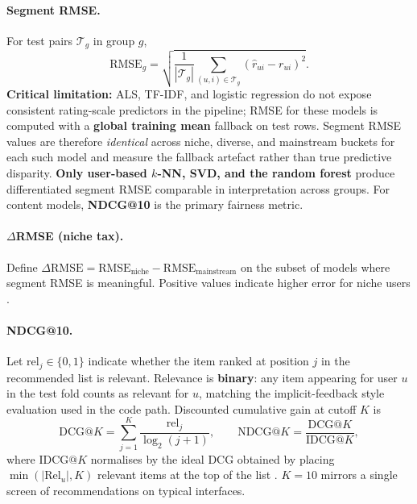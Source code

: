\paragraph{Segment RMSE.}
For test pairs $\mathcal{T}_g$ in group $g$,
\begin{equation}
  \text{RMSE}_g = \sqrt{\frac{1}{|\mathcal{T}_g|}\sum_{(u,i)\in\mathcal{T}_g}(\hat r_{ui}-r_{ui})^2}.
\end{equation}
\textbf{Critical limitation:} ALS, TF-IDF, and logistic regression do not expose consistent rating-scale predictors in the pipeline; RMSE for these models is computed with a \textbf{global training mean} fallback on test rows. Segment RMSE values are therefore \emph{identical} across niche, diverse, and mainstream buckets for each such model and measure the fallback artefact rather than true predictive disparity. \textbf{Only user-based $k$-NN, SVD, and the random forest} produce differentiated segment RMSE comparable in interpretation across groups. For content models, \textbf{NDCG@10} is the primary fairness metric.

\paragraph{$\Delta$RMSE (niche tax).}
Define $\Delta\text{RMSE} = \text{RMSE}_{\text{niche}} - \text{RMSE}_{\text{mainstream}}$ on the subset of models where segment RMSE is meaningful. Positive values indicate higher error for niche users \citep{abdollahpouri2020multistakeholder}.

\paragraph{NDCG@10.}
Let $\text{rel}_j\in\{0,1\}$ indicate whether the item ranked at position $j$ in the recommended list is relevant. Relevance is \textbf{binary}: any item appearing for user $u$ in the test fold counts as relevant for $u$, matching the implicit-feedback style evaluation used in the code path. Discounted cumulative gain at cutoff $K$ is
\begin{equation}
  \text{DCG@}K = \sum_{j=1}^{K}\frac{\text{rel}_j}{\log_2(j+1)}, \qquad
  \text{NDCG@}K = \frac{\text{DCG@}K}{\text{IDCG@}K},
\end{equation}
where $\text{IDCG@}K$ normalises by the ideal DCG obtained by placing $\min(|\text{Rel}_u|,K)$ relevant items at the top of the list \citep{jarvelin2002cumulated}. $K=10$ mirrors a single screen of recommendations on typical interfaces.

